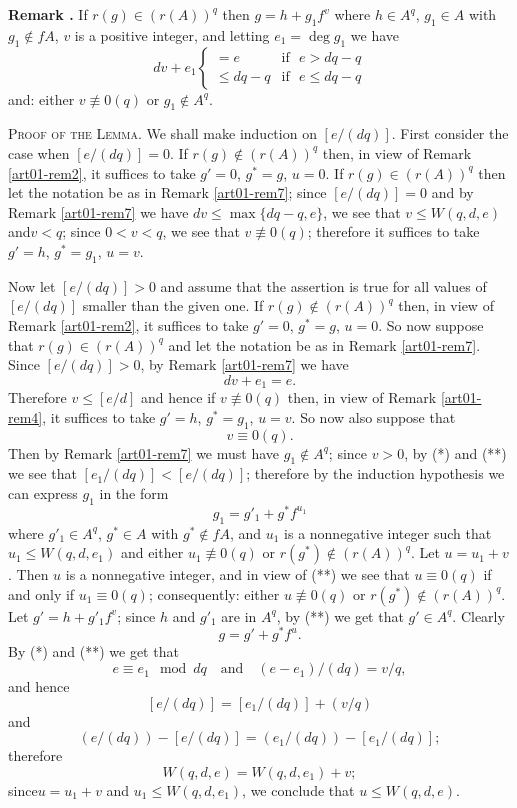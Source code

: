 \smallskip
\noindent
{\bf Remark .\label{art01-rem7}}
If $r(g)\in (r(A))^{q}$ then $g=h+g_{1}f^{v}$ where $h\in A^{q}$, $g_{1}\in A$ with $g_{1}\not\in fA$, $v$ is a positive integer, and letting $e_{1}=\deg g_{1}$ we have
$$
dv+e_{1}
\left\{
\begin{array}{ll}
=e & \text{if~ } e>dq-q\\
\leq dq-q & \text{if~ } e\leq dq-q
\end{array}\right.
$$
and: either $v\nequiv 0(q)$ or $g_{1}\not\in A^{q}$.

\smallskip
\noindent
\textsc{Proof of the Lemma.} We shall make induction on $[e/(dq)]$. First consider the case when $[e/(dq)]=0$. If $r(g)\not\in (r(A))^{q}$ then, in view of Remark \ref{art01-rem2}, it suffices to take $g'=0$, $g^{*}=g$, $u=0$. If $r(g)\in (r(A))^{q}$ then let the notation be as in Remark \ref{art01-rem7}; since $[e/(dq)]=0$ and by Remark \ref{art01-rem7} we have $dv\leq \max \{dq-q,e\}$, we see that $v\leq W(q,d,e)$ and\pageoriginale $v<q$; since $0<v<q$, we see that $v\nequiv 0(q)$; therefore it suffices to take $g'=h$, $g^{*}=g_{1}$, $u=v$.


Now let $[e/(dq)]>0$ and assume that the assertion is true for all values of $[e/(dq)]$ smaller than the given one. If $r(g)\not\in (r(A))^{q}$ then, in view of Remark \ref{art01-rem2}, it suffices to take $g'=0$, $g^{*}=g$, $u=0$. So now suppose that $r(g)\in (r(A))^{q}$ and let the notation be as in Remark \ref{art01-rem7}. Since $[e/(dq)]>0$, by Remark \ref{art01-rem7} we have
\begin{equation*}
dv+e_{1}=e.\tag{*}
\end{equation*}
Therefore $v\leq [e/d]$ and hence if $v\nequiv 0(q)$ then, in view of Remark \ref{art01-rem4}, it suffices to take $g'=h$, $g^{*}=g_{1}$, $u=v$. So now also suppose that
\begin{equation*}
v\equiv 0(q).\tag{**}
\end{equation*}
Then by Remark \ref{art01-rem7} we must have $g_{1}\not\in A^{q}$; since $v>0$, by (*) and (**) we see that $[e_{1}/(dq)]<[e/(dq)]$; therefore by the induction hypothesis we can express $g_{1}$ in the form
$$
g_{1}=g'_{1}+g^{*}f^{u_{1}}
$$
where $g'_{1}\in A^{q}$, $g^{*}\in A$ with $g^{*}\not\in fA$, and $u_{1}$ is a nonnegative integer such that $u_{1}\leq W(q,d,e_{1})$ and either $u_{1}\nequiv 0(q)$ or $r(g^{*})\not\in (r(A))^{q}$. Let $u=u_{1}+v$. Then $u$ is a nonnegative integer, and in view of (**) we see that $u\equiv 0(q)$ if and only if $u_{1}\equiv 0(q)$; consequently: either $u\nequiv 0(q)$ or $r(g^{*})\not\in (r(A))^{q}$. Let $g'=h+g'_{1}f^{v}$; since $h$ and $g'_{1}$ are in $A^{q}$, by (**) we get that $g'\in A^{q}$. Clearly
$$
g=g'+g^{*}f^{u}.
$$
By (*) and (**) we get that
$$
e\equiv e_{1}\mod dq \text{~~ and~~ } (e-e_{1})/(dq)=v/q,
$$
and hence
$$
[e/(dq)]=[e_{1}/(dq)]+(v/q)
$$
and
$$
(e/(dq))-[e/(dq)]=(e_{1}/(dq))-[e_{1}/(dq)];
$$
therefore
$$
W(q,d,e)=W(q,d,e_{1})+v;
$$
since\pageoriginale $u=u_{1}+v$ and $u_{1}\leq W(q,d,e_{1})$, we conclude that $u\leq W(q,d,e)$.


